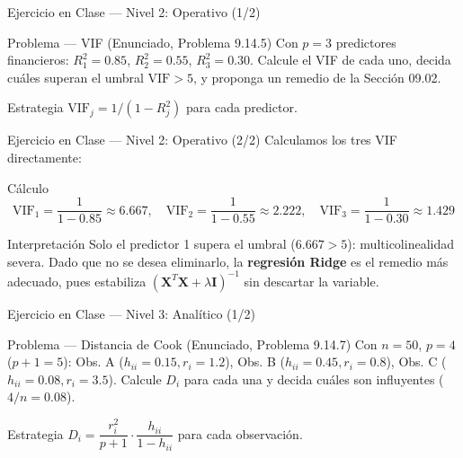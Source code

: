 \documentclass[10pt, aspectratio=169]{beamer}
\begin{document}
\begin{frame}{Ejercicio en Clase --- Nivel 2: Operativo (1/2)}
  \footnotesize
  \begin{block}{Problema --- VIF (Enunciado, Problema 9.14.5)}
    Con $p=3$ predictores financieros: $R_1^2=0.85$, $R_2^2=0.55$, $R_3^2=0.30$. Calcule el VIF de cada uno, decida cuáles superan el umbral $\text{VIF}>5$, y proponga un remedio de la Sección 09.02.
  \end{block}

  \vspace{0.15cm}
  \pause
  \begin{alertblock}{Estrategia}
    $\text{VIF}_j=1/(1-R_j^2)$ para cada predictor.
  \end{alertblock}
\end{frame}

\begin{frame}{Ejercicio en Clase --- Nivel 2: Operativo (2/2)}
  \scriptsize
  Calculamos los tres VIF directamente: \pause

  \vspace{0.05cm}
  \begin{block}{Cálculo}
    $$\text{VIF}_1=\frac{1}{1-0.85}\approx6.667, \quad \text{VIF}_2=\frac{1}{1-0.55}\approx2.222, \quad \text{VIF}_3=\frac{1}{1-0.30}\approx1.429$$
  \end{block}

  \vspace{0.05cm}
  \pause
  \begin{alertblock}{Interpretación}
    Solo el predictor 1 supera el umbral ($6.667>5$): multicolinealidad severa. Dado que no se desea eliminarlo, la \textbf{regresión Ridge} es el remedio más adecuado, pues estabiliza $(\mathbf{X}^T\mathbf{X}+\lambda\mathbf{I})^{-1}$ sin descartar la variable.
  \end{alertblock}
\end{frame}

\begin{frame}{Ejercicio en Clase --- Nivel 3: Analítico (1/2)}
  \footnotesize
  \begin{block}{Problema --- Distancia de Cook (Enunciado, Problema 9.14.7)}
    Con $n=50$, $p=4$ ($p+1=5$): Obs. A ($h_{ii}=0.15,r_i=1.2$), Obs. B ($h_{ii}=0.45,r_i=0.8$), Obs. C ($h_{ii}=0.08,r_i=3.5$). Calcule $D_i$ para cada una y decida cuáles son influyentes ($4/n=0.08$).
  \end{block}

  \vspace{0.1cm}
  \pause
  \begin{alertblock}{Estrategia}
    $D_i=\dfrac{r_i^2}{p+1}\cdot\dfrac{h_{ii}}{1-h_{ii}}$ para cada observación.
  \end{alertblock}
\end{frame}
\end{document}
